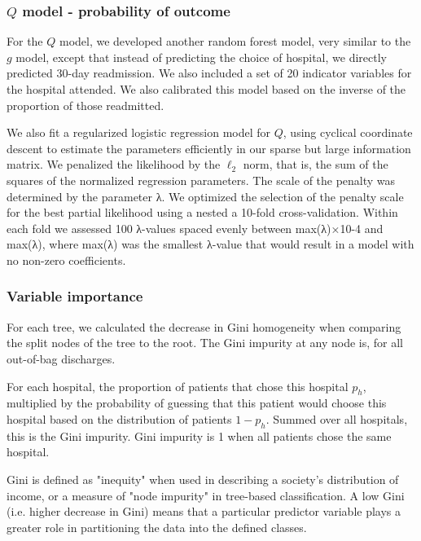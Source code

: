 \documentclass[]{article}\usepackage[]{graphicx}\usepackage[]{color}
\begin{document}
\subsubsection{\(Q\) model - probability of outcome}
For the  \(Q\) model, we developed another random forest model, very similar to the \(g\) model, except that instead of predicting the choice of hospital, we directly predicted 30-day readmission. We also included a set of 20 indicator variables for the hospital attended. We also calibrated this model based on the inverse of the proportion of those readmitted.

We also fit a regularized logistic regression model for \(Q\), using cyclical coordinate descent to estimate the parameters efficiently in our sparse but large information matrix. We penalized the likelihood by the \(\ell_2\) norm, that is, the sum of the squares of the normalized regression parameters. The scale of the penalty was determined by the parameter λ. We optimized the selection of the penalty scale for the best partial likelihood using a nested a 10-fold cross-validation. Within each fold we assessed 100 λ-values spaced evenly between max(λ)×10-4 and max(λ), where max(λ) was the smallest λ-value that would result in a model with no non-zero coefficients.

\subsubsection{Variable importance}
For each tree, we calculated the decrease in Gini homogeneity when comparing the split nodes of the tree to the root. 
The Gini impurity at any node is, for all out-of-bag discharges.

For each hospital, the proportion of patients that chose this hospital $p_h$, multiplied by the probability of guessing that this patient would choose this hospital based on the distribution of patients $1-p_h$. Summed over all hospitals, this is the Gini impurity. Gini impurity is 1 when all patients chose the same hospital.

Gini is defined as "inequity" when used in describing a society's distribution of income, or a measure of "node impurity" in tree-based classification. A low Gini (i.e. higher decrease in Gini) means that a particular predictor variable plays a greater role in partitioning the data into the defined classes. 
\end{document}
